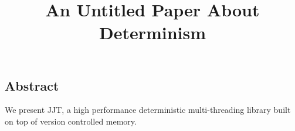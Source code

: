 \documentclass[letterpaper,twocolumn,10pt]{article}
\begin{document}
\date{}

\title{\Large \bf An Untitled Paper About Determinism}

\author{
} %

\maketitle

\thispagestyle{empty}

\newcommand{\checkout}{{\tt checkout()}}
\newcommand{\settled}{{\tt commit()}}
\newcommand{\settledm}{{\tt commit\_mutex()}}
\newcommand{\update}{{\tt update()}}
\newcommand{\updatem}{{\tt update\_mutex()}}
\newcommand{\commit}{{\tt commit()}}
\newcommand{\commitm}{{\tt commit\_mutex()}}
\newcommand{\mksnap}{{\tt commit()}}
\newcommand{\getsnap}{{\tt update()}}
\newcommand{\fork}{{\tt fork}}
\newcommand{\pte}{{\tt pte}}
\newcommand{\determEnd}{{\tt determ\_end}}
\newcommand{\pthread}{{\tt pthread}}


\newcommand{\create}{{\tt pthread\_create}}
\newcommand{\dthreads}{Dthreads}



\newcommand{\conversion}{{\sc \small Conversion}}
\newcommand{\lib}{{\sc \small JJT}}

\subsection*{Abstract}

We present \lib{}, a high performance deterministic multi-threading library built on top of version controlled memory.







{\footnotesize 
}


\theendnotes
\end{document}
